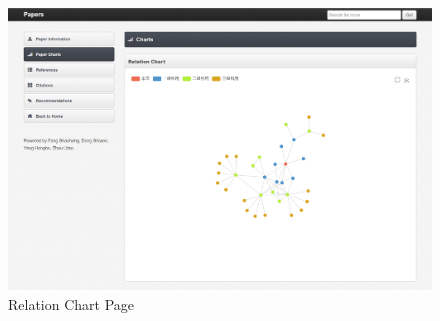 \documentclass{book}
\begin{document}
\begin{figure}[H]
\centering
\includegraphics[scale=0.4]{img/zlt_rel_demo.png}
\caption{Relation Chart Page}
\end{figure}
\end{document}
